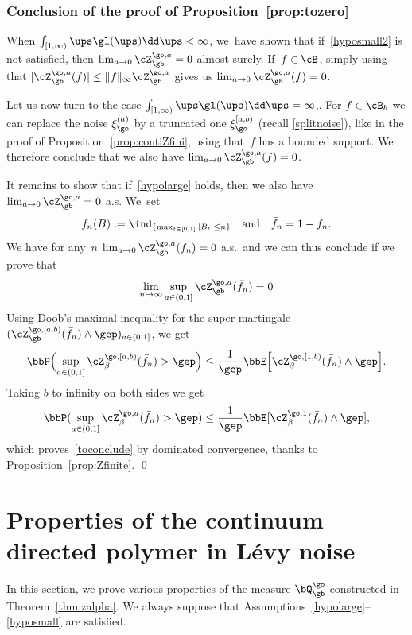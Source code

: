 \subsubsection{Conclusion of the proof of Proposition~\ref{prop:tozero}}

When $\int_{[1,\infty)} \ups \gl(\ups)\dd \ups<\infty$,
we~have shown that if~\eqref{hyposmall2} is not satisfied, then
$\lim_{a\to 0} \cZ_{\gb}^{\go,a}=0$ almost surely.
If~$f\in \cB$, simply using that $|\cZ_{\gb}^{\go,a}(f)|\le \|f\|_{\infty}\cZ_{\gb}^{\go,a}$ gives us $\lim_{a\to 0} \cZ_{\gb}^{\go,a}(f)=0$.

Let us now turn to the case $\int_{[1,\infty)} \ups \gl(\ups)\dd \ups=\infty$,.
For $f\in \cB_b$
we can replace the noise $\xi^{(a)}_\go$ by a truncated one
$\xi^{[a,b)}_\go$ (recall \eqref{splitnoise}), like in the proof of Proposition~\ref{prop:contiZfini}, using that~$f$ has a bounded support.
We therefore conclude that we also have
$\lim_{a\to 0} \cZ_{\gb}^{\go,a}(f)=0$.

It remains to show that if~\eqref{hypolarge} holds,
then we also have $\lim_{a\to 0} \cZ_{\gb}^{\go,a}=0$ a.s.
We~set
\[
f_n(B):= \ind_{\{\max_{t\in[0,1]}|B_t|\le n\}}\quad\text{and}\quad\bar f_n=1-f_n.
\]
We have for any~$n$
$\lim_{a\to 0}\cZ_{\gb}^{\go,a}(f_n)=0$ a.s.\ and
we can thus conclude if we prove that
\begin{equation}
\label{toconclude}
\lim_{n\to \infty} \sup_{a\in (0,1]}\cZ_{\gb}^{\go,a}(\bar f_n)=0
\end{equation}
Using Doob's maximal inequality for the super-martingale $(\cZ^{\go,[a,b)}_{\gb}(\bar f_n)\wedge \gep)_{a\in (0,1]}$, we get
\begin{equation}
\bbP\Bigl(\sup_{a\in(0,1]}\cZ^{\go,[a,b)}_\beta(\bar f_n) > \gep \Bigr) \le \frac{1}{\gep}\bbE \Bigl[ \cZ^{\go,[1,b)}_\beta(\bar f_n) \wedge \gep \Bigr].
\end{equation}
Taking $b$ to infinity on both sides
we get
\[
\bbP(\sup_{a\in(0,1]}\cZ^{\go,a}_\beta(\bar f_n) > \gep)\le \frac{1}{\gep}\bbE [ \cZ^{\go,1}_\beta(\bar f_n) \wedge \gep],
\]
which proves~\eqref{toconclude} by dominated convergence,
thanks to Proposition~\ref{prop:Zfinite}.
\qed

\section{Properties of the continuum directed polymer in Lévy noise}
\label{sec:properties}

In this section, we prove various properties of the
measure $\bQ_{\gb}^{\go}$ constructed in Theorem~\ref{thm:zalpha}.
We always suppose that Assumptions~\eqref{hypolarge}--\eqref{hyposmall} are satisfied.

